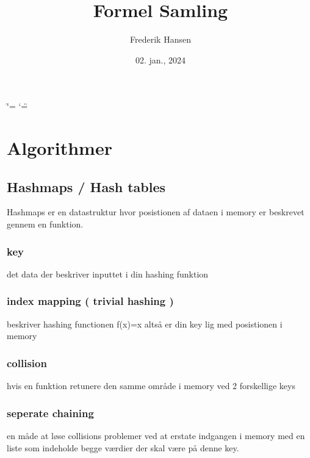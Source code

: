 \documentclass[letterpaper,10pt,danish]{sphinxmanual}
\title{Formel Samling}
\date{02. jan., 2024}
\author{Frederik Hansen}
\begin{document}
\ifdefined\shorthandoff
  \ifnum\catcode`\=\string=\active\shorthandoff{=}\fi
  \ifnum\catcode`\"=\active{}\fi
\fi

\pagestyle{empty}
\sphinxmaketitle
\pagestyle{plain}
\sphinxtableofcontents
\pagestyle{normal}
\label{\detokenize{index::doc}}


\sphinxstepscope


\chapter{Algorithmer}
\label{\detokenize{Algorithmer/index:algorithmer}}\label{\detokenize{Algorithmer/index::doc}}
\sphinxstepscope


\section{Hashmaps / Hash tables}
\label{\detokenize{Algorithmer/Hashmaps:hashmaps-hash-tables}}\label{\detokenize{Algorithmer/Hashmaps::doc}}
\sphinxAtStartPar
Hashmaps er en datastruktur hvor posistionen af dataen i memory er beskrevet gennem en funktion.


\subsection{key}
\label{\detokenize{Algorithmer/Hashmaps:key}}
\sphinxAtStartPar
det data der beskriver inputtet i din hashing funktion


\subsection{index mapping ( trivial hashing )}
\label{\detokenize{Algorithmer/Hashmaps:index-mapping-trivial-hashing}}
\sphinxAtStartPar
beskriver hashing functionen f(x)=x altså er din key lig med posistionen i memory


\subsection{collision}
\label{\detokenize{Algorithmer/Hashmaps:collision}}
\sphinxAtStartPar
hvis en funktion retunere den samme område i memory ved 2 forskellige keys


\subsection{seperate chaining}
\label{\detokenize{Algorithmer/Hashmaps:seperate-chaining}}
\sphinxAtStartPar
en måde at løse collisions problemer ved at erstate indgangen i memory med en liste som indeholde begge værdier der skal være på denne key.
\end{document}
